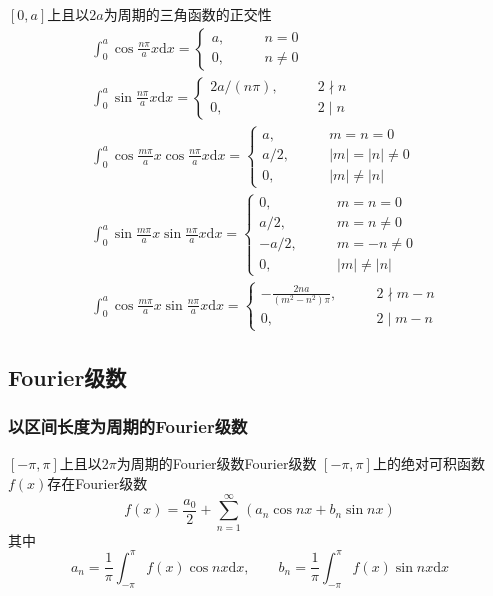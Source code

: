 \documentclass[lang = cn, scheme = chinese, thmcnt = section]{elegantbook}
\newcommand{\dd}{\mathrm{d}}           %
\newcommand{\dis}{\displaystyle}
\begin{document}
\begin{theorem}{$[0,a]$上且以$2a$为周期的三角函数的正交性}
	\begin{align*}
		& \int_{0}^{a}\cos \frac{n\pi}{a}x\dd x=\begin{cases}
			a,\qquad & n=0\\
			0,\qquad & n\ne 0
		\end{cases}\\
		& \int_{0}^{a}\sin \frac{n\pi}{a}x\dd x=\begin{cases}
			2a/(n\pi),\qquad & 2\nmid n\\
			0,\qquad & 2\mid n
		\end{cases}\\
		& \int_{0}^{a}\cos \frac{m\pi}{a}x\cos \frac{n\pi}{a}x \dd x=\begin{cases}
			a,\qquad & m=n=0\\
			a/2,\qquad & |m|=|n|\ne 0\\
			0,\qquad & |m|\ne |n|
		\end{cases}\\
		& \int_{0}^{a}\sin \frac{m\pi}{a}x\sin \frac{n\pi}{a}x \dd x=\begin{cases}
			0,\qquad & m=n=0\\
			a/2,\qquad & m=n\ne 0\\
			-a/2,\qquad & m=-n\ne 0\\
			0,\qquad & |m|\ne |n|
		\end{cases}\\
		& \int_{0}^{a}\cos \frac{m\pi}{a}x\sin \frac{n\pi}{a}x\dd x=\begin{cases}
			\dis-\frac{2na}{(m^2-n^2)\pi},\qquad & 2\nmid m-n\\
			0,\qquad & 2\mid m-n
		\end{cases}
	\end{align*}
\end{theorem}

\subsection{Fourier级数}

\subsubsection{以区间长度为周期的Fourier级数}

\begin{theorem}{$[-\pi,\pi]$上且以$2\pi$为周期的Fourier级数}{Fourier级数}
	$[-\pi,\pi]$上的绝对可积函数$f(x)$存在Fourier级数%
	$$
	f(x)=\frac{a_0}{2}+\sum_{n=1}^{\infty}(a_n\cos nx+b_n\sin nx)
	$$
	其中%
	$$
	a_n=\frac{1}{\pi}\int_{-\pi}^{\pi}f(x)\cos n x\dd x,\qquad 
	b_n=\frac{1}{\pi}\int_{-\pi}^{\pi}f(x)\sin n x\dd x
	$$
\end{theorem}
\end{document}
